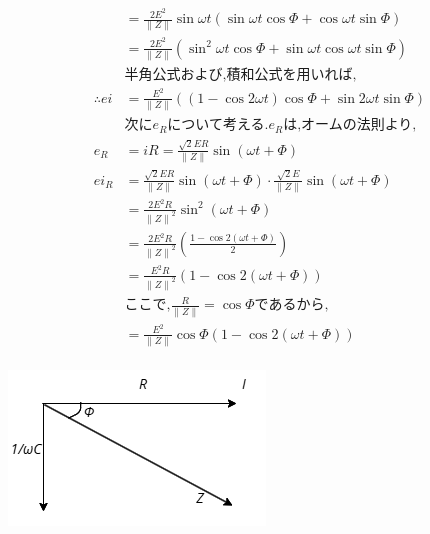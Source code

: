 \documentclass[twocolumn]{article}
\begin{document}
\begin{enumerate}
\begin{align*}
                        & = \frac{2E^2}{\|Z\|}\sin\omega t\left(\sin\omega t \cos \Phi + \cos\omega t \sin \Phi\right)                            \\
                        & = \frac{2E^2}{\|Z\|}\left(\sin^2\omega t \cos \Phi + \sin\omega t\cos\omega t \sin \Phi\right)                          \\
                        & \text{半角公式および,積和公式を用いれば,}                                                                                               \\
          \therefore ei & = \frac{E^2}{\|Z\|}\left(\left(1-\cos2\omega t\right)\cos \Phi + \sin2\omega t \sin \Phi\right)                         \\
                        & \text{次に}e_R\text{について考える.}e_R\text{は,オームの法則より,}                                                                        \\
          e_R           & = iR = \frac{\sqrt{2}ER}{\|Z\|}\sin\left(\omega t + \Phi\right)                                                         \\
          ei_R          & = \frac{\sqrt{2}ER}{\|Z\|}\sin\left(\omega t + \Phi\right)\cdot \frac{\sqrt{2}E}{\|Z\|}\sin\left(\omega t + \Phi\right) \\
                        & = \frac{2E^2R}{{\|Z\|}^2}\sin^2\left(\omega t + \Phi\right)                                                             \\
                        & = \frac{2E^2R}{{\|Z\|}^2}\left(\frac{1 - \cos2\left(\omega t + \Phi\right)}{2}\right)                                   \\
                        & = \frac{E^2R}{{\|Z\|}^2}\left(1 - \cos2\left(\omega t + \Phi\right)\right)                                              \\
                        & \text{ここで,}\frac{R}{\|Z\|} = \cos \Phi\text{であるから,}                                                                     \\
                        & = \frac{E^2}{{\|Z\|}}\cos\Phi\left(1 - \cos2\left(\omega t + \Phi\right)\right)                                         \\
        \end{align*}
        \begin{center}
          \includegraphics[width=0.6\linewidth]{./capacitor_Vector_img.png}
        \end{center}


\end{enumerate}
\end{document}
